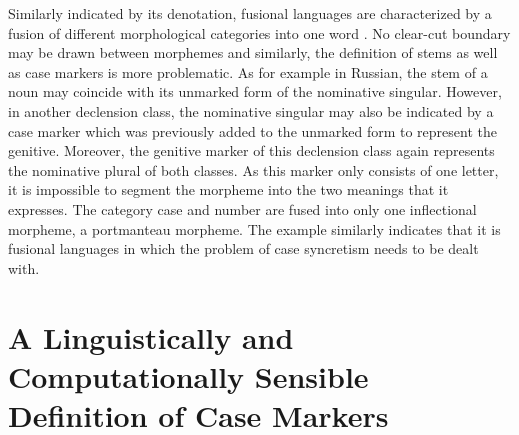 \documentclass[11pt,a4paper,twoside,openright]{scrbook}
\begin{document}
Similarly indicated by its denotation, fusional languages are characterized by a fusion of different morphological categories into one word \citep{comrie1989typol}. No clear-cut boundary may be drawn between morphemes and similarly, the definition of stems as well as case markers is more problematic. As for example in Russian, the stem of a noun may coincide with its unmarked form of the nominative singular. However, in another declension class, the nominative singular may also be indicated by a case marker which was previously added to the unmarked form to represent the genitive. Moreover, the genitive marker of this declension class again represents the nominative plural of both classes. As this marker only consists of one letter, it is impossible to segment the morpheme into the two meanings that it expresses. The category case and number are fused into only one inflectional morpheme, a portmanteau morpheme. The example similarly indicates that it is fusional languages in which the problem of case syncretism needs to be dealt with.





\section{A Linguistically and Computationally Sensible Definition of Case Markers}
\end{document}
